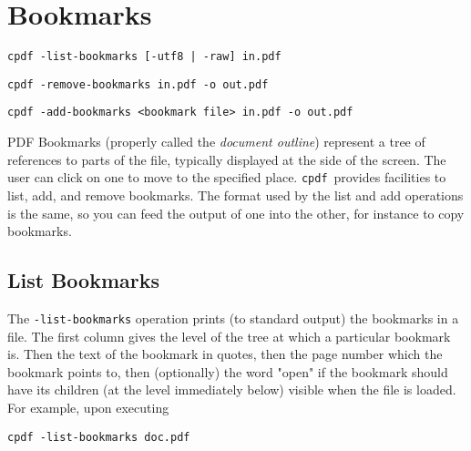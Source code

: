 \documentclass{book}
\newcommand{\cpdf}{\texttt{cpdf}}
\begin{document}
%  


\chapter{Bookmarks}
  \begin{framed}
  \small\noindent\verb!cpdf -list-bookmarks [-utf8 | -raw] in.pdf!

  \vspace{1.5mm}
  \small\noindent\verb!cpdf -remove-bookmarks in.pdf -o out.pdf!

  \vspace{1.5mm}
  \small\noindent\verb!cpdf -add-bookmarks <bookmark file> in.pdf -o out.pdf!

  \end{framed}
  PDF Bookmarks (properly called the \textit{document outline}) represent a tree
of references to parts of the file, typically displayed at the side of the
screen. The user can click on one to move to the specified place. \cpdf\ provides
facilities to list, add, and remove bookmarks. The format used by the list and
add operations is the same, so you can feed the output of one into the other,
for instance to copy bookmarks.

  \section{List Bookmarks}
  The \texttt{-list-bookmarks} operation prints (to standard output) the
bookmarks in a file. The first column gives the level of the tree at which a
particular bookmark is. Then the text of the bookmark in quotes, then the page
number which the bookmark points to, then (optionally) the word "open" if the
bookmark should have its children (at the level immediately below) visible when
the file is loaded. For example, upon executing
\begin{framed}
  \small\verb!cpdf -list-bookmarks doc.pdf!
\end{framed}
\end{document}
